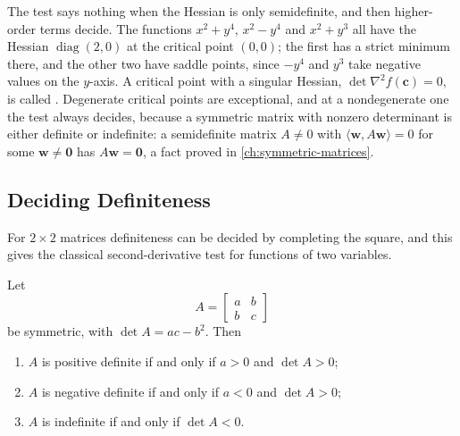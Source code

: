 The test says nothing when the Hessian is only semidefinite, and then higher-order terms decide. The functions $x^2+y^4$, $x^2-y^4$ and $x^2+y^3$ all have the Hessian $\operatorname{diag}(2,0)$ at the critical point $(0,0)$; the first has a strict minimum there, and the other two have saddle points, since $-y^4$ and $y^3$ take negative values on the $y$-axis. A critical point with a singular Hessian, $\det\nabla^2f(\mathbf c)=0$, is called . Degenerate critical points are exceptional, and at a nondegenerate one the test always decides, because a symmetric matrix with nonzero determinant is either definite or indefinite: a semidefinite matrix $A\ne0$ with $\langle\mathbf w,A\mathbf w\rangle=0$ for some $\mathbf w\ne\mathbf0$ has $A\mathbf w=\mathbf0$, a fact proved in \cref{ch:symmetric-matrices}.

\subsection{Deciding Definiteness}

For $2\times2$ matrices definiteness can be decided by completing the square, and this gives the classical second-derivative test for functions of two variables.

\begin{proposition}
\label{prop:definite-2x2}
Let
\[
A=\begin{bmatrix}a&b\\b&c\end{bmatrix}
\]
be symmetric, with $\det A=ac-b^2$. Then
\begin{enumerate}
\item $A$ is positive definite if and only if $a>0$ and $\det A>0$;
\item $A$ is negative definite if and only if $a<0$ and $\det A>0$;
\item $A$ is indefinite if and only if $\det A<0$.
\end{enumerate}
\end{proposition}

